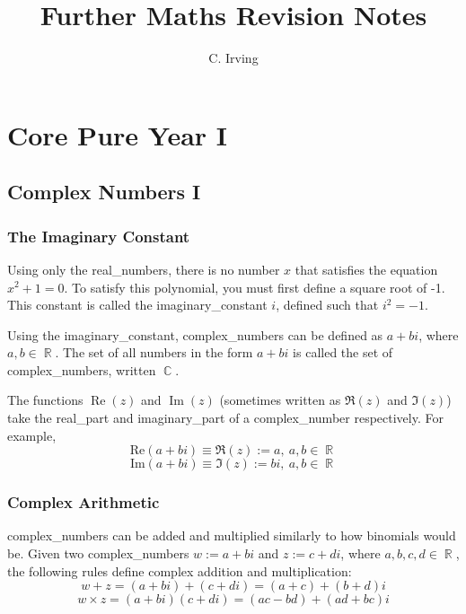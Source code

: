 \documentclass{book}
\title{Further Maths Revision Notes}
\author{C. Irving}
\date{}
\DeclareMathOperator{\real}{Re}
\DeclareMathOperator{\imag}{Im}
\DeclareMathOperator{\R}{\mathbb{R}}
\DeclareMathOperator{\C}{\mathbb{C}}
\begin{document}
\maketitle

\tableofcontents

\mainmatter

\chapter{Core Pure Year I} \label{ch:core_pure_i}
    \section{Complex Numbers I} \label{complex_numbers_i}
        \subsection{The Imaginary Constant}
            Using only the \glspl{real_number}, there is no number $x$ that satisfies the equation $x^2+1=0$.
            To satisfy this \gls{polynomial}, you must first define a square root of -1.
            This constant is called the \gls{imaginary_constant} $i$, defined such that $i^2=-1$.
            
            Using the \gls{imaginary_constant}, \glspl{complex_number} can be defined as $a+bi$, where $a,b\in\R$.
            The set of all numbers in the form $a+bi$ is called the set of \glspl{complex_number}, written $\C$.

            The functions $\real(z)$ and $\imag(z)$ (sometimes written as $\Re(z)$ and $\Im(z)$) take the \gls{real_part} and \gls{imaginary_part} of a \gls{complex_number} respectively.
            For example,
            \begin{equation} \label{eq:real_part}
                \text{Re}(a+bi)\equiv\Re(z):=a,\ a,b\in\R
            \end{equation}
            \begin{equation} \label{eq:imaginary_part}
                \text{Im}(a+bi)\equiv\Im(z):=bi,\ a,b\in\R
            \end{equation}

        \subsection{Complex Arithmetic}
            \Glspl{complex_number} can be added and multiplied similarly to how binomials would be.
            Given two \glspl{complex_number} $w:=a+bi$ and $z:=c+di$, where $a,b,c,d\in\R$, the following rules define complex addition and multiplication:
            \begin{equation} \label{eqn:complex_addition}
                w+z=(a+bi)+(c+di)=(a+c)+(b+d)i
            \end{equation}
            \begin{equation} \label{eqn:complex_multiplication}
                w\times z=(a+bi)(c+di)=(ac-bd)+(ad+bc)i
            \end{equation}
\end{document}
